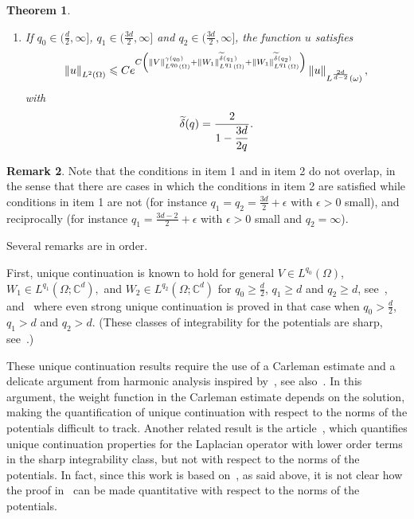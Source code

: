 \documentclass[10pt]{amsart}
\newtheorem{theo}{Theorem}[section]
\theoremstyle{definition}\newtheorem{defi}[theo]{Definition}\newtheorem{rema}[theo]{Remark}\newtheorem{exam}[theo]{Example}\newtheorem{exem}[theo]{Example}\newtheorem{nota}[theo]{Notation}
\newcommand*\C{\mathbb{C}}
\newcommand*\ds{\displaystyle}
\newcommand{\norm}[1]{\left\Vert#1\right\Vert}
\renewcommand{\geq}{\geqslant}
\renewcommand{\tilde}{\widetilde}
\let\oldtilde\tilde
\renewcommand*{\tilde}[1]{\mathchoice{\widetilde{#1}}{\widetilde{#1}}{\oldtilde{#1}}{\oldtilde{#1}}}
\begin{document}
\begin{theo}
\begin{enumerate}
\item\label{theo1.3.2} If $q_0 \in (\frac{d}{2}, \infty]$, $q_1 \in (\frac{3d}{2}, \infty]$ and $q_2\in (\frac{3d}{2}, \infty]$, the function $u$ satisfies
\begin{equation}\label{Quantitative}
\norm{u }_{L^2(\Omega)} \leqslant C e^{ C \left(\norm{V}_{L^{q_0}(\Omega)}^{\gamma(q_0)}+\norm{W_1}_{L^{q_1}(\Omega)}^{\tilde\delta(q_1)} + \norm{W_1}_{L^{q_1}(\Omega)}^{\tilde\delta(q_2)}
\right) }\norm{u}_{L^{\frac{2d}{d-2}}(\omega)},
\end{equation}
with
\begin{equation*}
\tilde \delta(q) = \frac{2}{\ds 1 - \frac{3d}{2q}}.
\end{equation*}
\end{enumerate}
\end{theo}


\begin{rema}
Note that the conditions in item 1 and in item 2 do not overlap, in the sense that there are cases in which the conditions in item 2 are satisfied while conditions in item 1 are not (for instance $q_1 = q_2 = \frac{3d}{2} + \epsilon$ with $\epsilon >0$ small), and reciprocally (for instance $q_1 = \frac{3d-2}{2} + \epsilon$ with $\epsilon>0$ small and $q_2 = \infty$).
\end{rema}

Several remarks are in order.

First, unique continuation is known to hold for general $ V\in L^{q_0}(\Omega)$, $W_1 \in L^{q_1}(\Omega; \C^d),$ and $W_2 \in L^{q_2}(\Omega; \C^d)$ for $q_0 \geq \frac{d}{2}$, $q_1\geq d$ and $q_2 \geq d$, see~\cite{Wolff-1993}, and~\cite{koch2001carleman} where even strong unique continuation is proved in that case when $q_0 > \frac{d}{2}$, $q_1 > d$ and $q_2 > d$. (These classes of integrability for the potentials are sharp, see~\cite{koch2002sharp}.)

These unique continuation results require the use of a Carleman estimate and a delicate argument from harmonic analysis inspired by~\cite{wolff1992property}, see also~\cite{koch2001carleman}. In this argument, the weight function in the Carleman estimate depends on the solution, making the quantification of unique continuation with respect to the norms of the potentials difficult to track. Another related result is the article~\cite{malinnikova2012quantitative}, which quantifies unique continuation properties for the Laplacian operator with lower order terms in the sharp integrability class, but not with respect to the norms of the potentials. In fact, since this work is based on~\cite{koch2001carleman}, as said above, it is not clear how the proof in~\cite{malinnikova2012quantitative} can be made quantitative with respect to the norms of the potentials.
\end{document}

